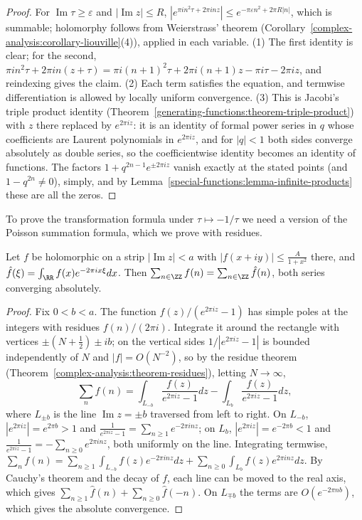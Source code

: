\begin{proof}
For $\operatorname{Im}\tau \geq \varepsilon$ and $|\operatorname{Im}z| \leq R$, $|e^{\pi in^2\tau + 2\pi inz}| \leq e^{-\pi\varepsilon n^2 + 2\pi R|n|}$, which is summable; holomorphy follows from Weierstrass' theorem
(Corollary~\ref{complex-analysis:corollary-liouville}(4)), applied in each variable. (1) The first identity is clear; for the second, $\pi in^2\tau + 2\pi in(z + \tau) = \pi i(n + 1)^2\tau + 2\pi i(n + 1)z - \pi i\tau - 2\pi iz$, and reindexing gives the claim.
(2) Each term satisfies the equation, and termwise differentiation is allowed by locally uniform convergence. (3) This is Jacobi's triple product identity (Theorem~\ref{generating-functions:theorem-triple-product}) with
$z$ there replaced by $e^{2\pi iz}$: it is an identity of formal power series in $q$ whose coefficients are Laurent polynomials in $e^{2\pi iz}$, and for $|q| < 1$ both sides converge absolutely as double series, so the
coefficientwise identity becomes an identity of functions. The factors $1 + q^{2n-1}e^{\pm 2\pi iz}$ vanish exactly at the stated points (and $1 - q^{2n} \neq 0$), simply, and by Lemma~\ref{special-functions:lemma-infinite-products} these are all the zeros.
\end{proof}

To prove the transformation formula under $\tau \mapsto -1/\tau$ we need a version of the Poisson summation formula, which we prove with residues.

\begin{lemma}\label{special-functions:lemma-poisson-strip}
Let $f$ be holomorphic on a strip $|\operatorname{Im}z| < a$ with $|f(x + iy)| \leq \frac{A}{1 + x^2}$ there, and $\hat{f}(\xi) = \int_\RR f(x)e^{-2\pi ix\xi}dx$. Then $\sum_{n \in \ZZ}f(n) = \sum_{n \in \ZZ}\hat{f}(n)$, both series converging
absolutely.
\end{lemma}

\begin{proof}
Fix $0 < b < a$. The function $f(z)/(e^{2\pi iz} - 1)$ has simple poles at the integers with residues $f(n)/(2\pi i)$. Integrate it around the rectangle with vertices $\pm(N + \frac12) \pm ib$; on the vertical sides
$1/|e^{2\pi iz} - 1|$ is bounded independently of $N$ and $|f| = O(N^{-2})$, so by the residue theorem (Theorem~\ref{complex-analysis:theorem-residues}), letting $N \to \infty$,
\[
\sum_nf(n) = \int_{L_{-b}}\frac{f(z)}{e^{2\pi iz} - 1}dz - \int_{L_b}\frac{f(z)}{e^{2\pi iz} - 1}dz,
\]
where $L_{\pm b}$ is the line $\operatorname{Im}z = \pm b$ traversed from left to right. On $L_{-b}$, $|e^{2\pi iz}| = e^{2\pi b} > 1$ and $\frac{1}{e^{2\pi iz} - 1} = \sum_{n \geq 1}e^{-2\pi inz}$; on $L_b$, $|e^{2\pi iz}| = e^{-2\pi b} < 1$ and
$\frac{1}{e^{2\pi iz} - 1} = -\sum_{n \geq 0}e^{2\pi inz}$, both uniformly on the line. Integrating termwise, $\sum_nf(n) = \sum_{n \geq 1}\int_{L_{-b}}f(z)e^{-2\pi inz}dz + \sum_{n \geq 0}\int_{L_b}f(z)e^{2\pi inz}dz$. By Cauchy's theorem and the
decay of $f$, each line can be moved to the real axis, which gives $\sum_{n \geq 1}\hat{f}(n) + \sum_{n \geq 0}\hat{f}(-n)$. On $L_{\mp b}$ the terms are $O(e^{-2\pi nb})$, which gives the absolute convergence.
\end{proof}

